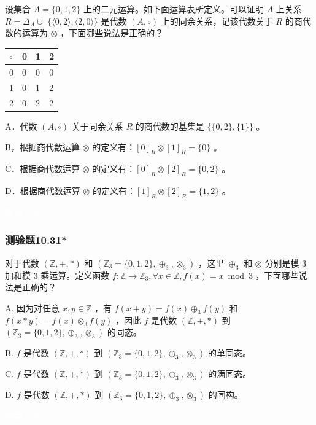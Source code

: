 \documentclass[UTF8, heading=true]{ctexart}
\begin{document}
设集合 $A=\{0,1,2\}$ 上的二元运算。如下面运算表所定义。可以证明 $A$ 上关系 $R=\Delta_A \cup$ $\{\langle 0,2\rangle,\langle 2,0\rangle\}$ 是代数 $(A, \circ)$ 上的同余关系，记该代数关于 $R$ 的商代数的运算为 $\otimes$ ，下面哪些说法是正确的？
\begin{table}[H]
  \renewcommand{\arraystretch}{1.5}
  \centering
  \begin{tabular}{l|lll}
\hline$\circ$ & 0 & 1 & 2 \\
\hline 0 & 0 & 0 & 0 \\
1 & 0 & 1 & 2 \\
2 & 0 & 2 & 2 \\
\hline
\end{tabular}
\end{table}

A．代数 $(A, \circ)$ 关于同余关系 $R$ 的商代数的基集是 $\{\{0,2\},\{1\}\}$ 。

B，根据商代数运算 $\otimes$ 的定义有：$[0]_R \otimes[1]_R=\{0\}$ 。

C．根据商代数运算 $\otimes$ 的定义有：$[0]_R \otimes[2]_R=\{0,2\}$ 。

D．根据商代数运算 $\otimes$ 的定义有：$[1]_R \otimes[2]_R=\{1,2\}$ 。

\textcolor{white}{答案：AC}

\subsubsection{测验题10.31*}

对于代数 $(\mathbb{Z},+, *)$ 和 $\left(\mathbb{Z}_3=\{0,1,2\}, \oplus_3, \otimes_3\right)$ ，这里 $\oplus_3$ 和 $\otimes$ 分别是模 3 加和模 3 乘运算。定义函数 $f: \mathbb{Z} \rightarrow \mathbb{Z}_3, \forall x \in \mathbb{Z}, f(x)=x \bmod 3$ ，下面哪些说法是正确的？

A. 因为对任意 $x, y \in \mathbb{Z}$ ，有 $f(x+y)=f(x) \oplus_3 f(y)$ 和 $f(x * y)=f(x) \otimes_3 f(y)$ ，因此 $f$ 是代数 $(\mathbb{Z},+, *)$ 到 $\left(\mathbb{Z}_3=\{0,1,2\}, \oplus_3, \otimes_3\right)$ 的同态。

B. $f$ 是代数 $(\mathbb{Z},+, *)$ 到 $\left(\mathbb{Z}_3=\{0,1,2\}, \oplus_3, \otimes_3\right)$ 的单同态。

C. $f$ 是代数 $(\mathbb{Z},+, *)$ 到 $\left(\mathbb{Z}_3=\{0,1,2\}, \oplus_3, \otimes_3\right)$ 的满同态。

D. $f$ 是代数 $(\mathbb{Z},+, *)$ 到 $\left(\mathbb{Z}_3=\{0,1,2\}, \oplus_3, \otimes_3\right)$ 的同构。

\textcolor{white}{答案：AC}
\end{document}
